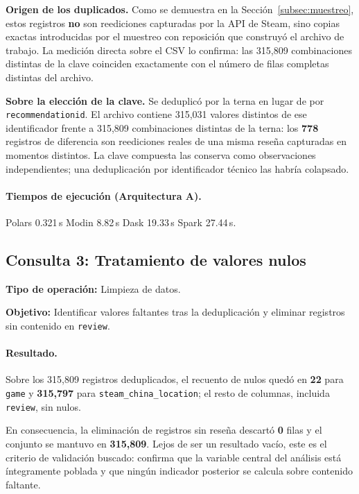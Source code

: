 \textbf{Origen de los duplicados.} Como se demuestra en la Sección~\ref{subsec:muestreo}, estos registros \textbf{no} son reediciones capturadas por la API de Steam, sino copias exactas introducidas por el muestreo con reposición que construyó el archivo de trabajo. La medición directa sobre el CSV lo confirma: las 315,809 combinaciones distintas de la clave coinciden exactamente con el número de filas completas distintas del archivo.

\textbf{Sobre la elección de la clave.} Se deduplicó por la terna en lugar de por \texttt{recommendationid}. El archivo contiene 315,031 valores distintos de ese identificador frente a 315,809 combinaciones distintas de la terna: los \textbf{778} registros de diferencia son reediciones reales de una misma reseña capturadas en momentos distintos. La clave compuesta las conserva como observaciones independientes; una deduplicación por identificador técnico las habría colapsado.

\paragraph{Tiempos de ejecución (Arquitectura A).}
Polars 0.321\,s \textbar{} Modin 8.82\,s \textbar{} Dask 19.33\,s \textbar{} Spark 27.44\,s.



\subsection{Consulta 3: Tratamiento de valores nulos}

\textbf{Tipo de operación:} Limpieza de datos.

\textbf{Objetivo:} Identificar valores faltantes tras la deduplicación y eliminar registros sin contenido en \texttt{review}.


\paragraph{Resultado.}
Sobre los 315,809 registros deduplicados, el recuento de nulos quedó en \textbf{22} para \texttt{game} y \textbf{315,797} para \texttt{steam\_\bk{}china\_\bk{}location}; el resto de columnas, incluida \texttt{review}, sin nulos.

En consecuencia, la eliminación de registros sin reseña descartó \textbf{0} filas y el conjunto se mantuvo en \textbf{315,809}. Lejos de ser un resultado vacío, este es el criterio de validación buscado: confirma que la variable central del análisis está íntegramente poblada y que ningún indicador posterior se calcula sobre contenido faltante.

